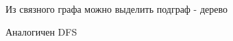 \documentclass[discrete.tex]{subfiles}
\begin{document}
\begin{theorem}
    Из связного графа можно выделить подграф - дерево
\end{theorem}

\begin{definition}
    Аналогичен DFS
\end{definition}
\end{document}
